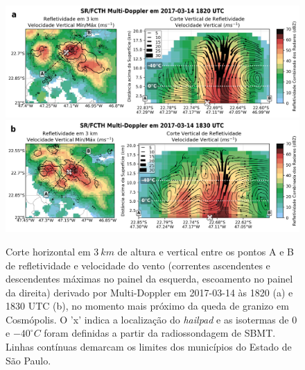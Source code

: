 \begin{figure}[htb]
	\centering
	\caption{Corte horizontal em $3\:km$ de altura e vertical entre os pontos A e B de refletividade e velocidade do vento (correntes ascendentes e descendentes máximas no painel da esquerda, escoamento no painel da direita) derivado por Multi-Doppler em 2017-03-14 às 1820 (a) e 1830 UTC (b), no momento mais próximo da queda de granizo em Cosmópolis. O 'x' indica a localização do \textit{hailpad} e as isotermas de $0$ e $-40^{\circ}C$ foram definidas a partir da radiossondagem de SBMT. Linhas contínuas demarcam os limites dos municípios do Estado de São Paulo.} 
	\label{doppler_20170314_1}
	\vspace{-5pt}
	\includegraphics[width=\columnwidth]{../MultiDoppler_Processing/figures/SR-FCTH 2017-03-14 1820 UTC_ptbr.png} \\
	\vspace{-5pt}
	\includegraphics[width=\columnwidth]{../MultiDoppler_Processing/figures/SR-FCTH 2017-03-14 1830 UTC_ptbr.png} \\
\end{figure}

